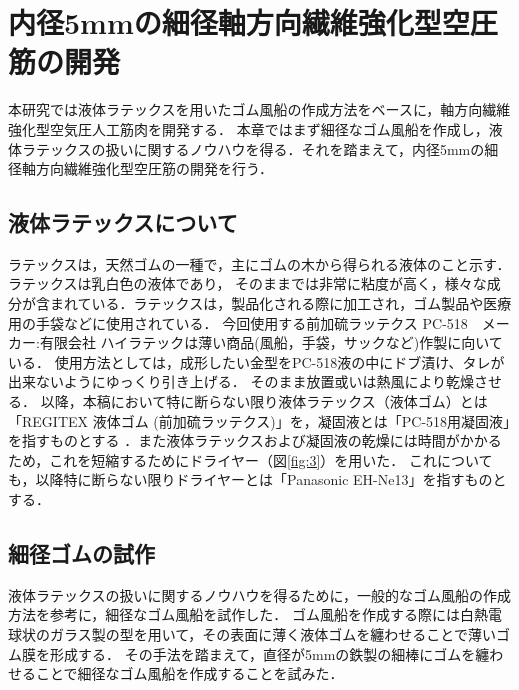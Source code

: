 \newpage
\section{内径5mmの細径軸方向繊維強化型空圧筋の開発}
本研究では液体ラテックスを用いたゴム風船の作成方法をベースに，軸方向繊維強化型空気圧人工筋肉を開発する．
本章ではまず細径なゴム風船を作成し，液体ラテックスの扱いに関するノウハウを得る．それを踏まえて，内径5mmの細径軸方向繊維強化型空圧筋の開発を行う．
\subsection{液体ラテックスについて}
ラテックスは，天然ゴムの一種で，主にゴムの木から得られる液体のこと示す．ラテックスは乳白色の液体であり，
そのままでは非常に粘度が高く，様々な成分が含まれている．ラテックスは，製品化される際に加工され，ゴム製品や医療用の手袋などに使用されている\cite{4}．
今回使用する前加硫ラッテクス PC-518　メーカー:有限会社 ハイラテックは薄い商品(風船，手袋，サックなど)作製に向いている．
使用方法としては，成形したい金型をPC-518液の中にドブ漬け、タレが出来ないようにゆっくり引き上げる．
そのまま放置或いは熱風により乾燥させる\cite{5}．
以降，本稿において特に断らない限り液体ラテックス（液体ゴム）とは「REGITEX 液体ゴム (前加硫ラッテクス)」を，凝固液とは「PC-518用凝固液」を指すものとする
．また液体ラテックスおよび凝固液の乾燥には時間がかかるため，これを短縮するためにドライヤー（図\ref{fig:3}）を用いた．
これについても，以降特に断らない限りドライヤーとは「Panasonic EH-Ne13」を指すものとする．
\subsection{細径ゴムの試作}
液体ラテックスの扱いに関するノウハウを得るために，一般的なゴム風船の作成方法\cite{6}を参考に，細径なゴム風船を試作した．
ゴム風船を作成する際には白熱電球状のガラス製の型を用いて，その表面に薄く液体ゴムを纏わせることで薄いゴム膜を形成する．
その手法を踏まえて，直径が5mmの鉄製の細棒にゴムを纏わせることで細径なゴム風船を作成することを試みた．
